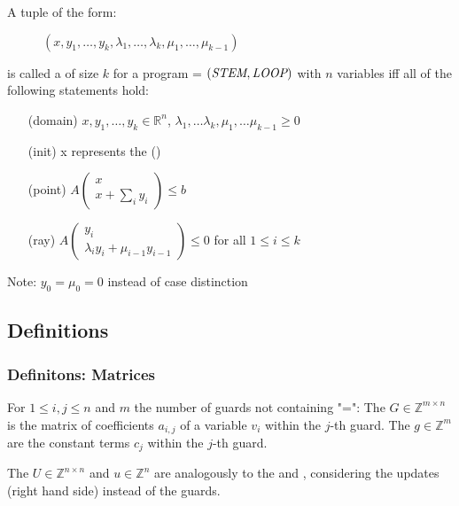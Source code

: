 \begin{frame}
	\begin{definition}
		\label{def:gna}
		A tuple of the form:
		\vspace{-1em}
		\begin{figure}
			\centering
			$(x, y_1, \dots, y_k, \lambda_1, \dots, \lambda_k, \mu_1, \dots, \mu_{k-1})$
		\end{figure}  
		\vspace{-1em}
		is called a \gna of size $k$ for a program = $(\textit{STEM}, \textit{LOOP})$ with $n$ variables iff all of the following statements hold:
		\begin{itemize}
			\setlength{\itemindent}{1in}
			\item[(domain)] $x, y_1, \dots, y_k \in \mathbb{R}^n$, $\lambda_1, \dots \lambda_k, \mu_1, \dots \mu_{k-1} \ge 0$
			\item[(init)] x represents the \startterm (\stem)
			\item[(point)] $A\begin{pmatrix} x \\ x + \sum_i y_i \end{pmatrix} \le b$
			\item[(ray)] $A\begin{pmatrix} y_i \\ \lambda_i y_i + \mu_{i-1} y_{i-1} \end{pmatrix} \le 0$ for all $1 \le i \le k$
		\end{itemize}
		Note: $y_0 = \mu_0 = 0$ instead of case distinction
	\end{definition}
\end{frame}

\subsection{Definitions}

\begin{frame}
	\frametitle{Definitons: Matrices}
	\begin{definition}[\guardmatrix, \guardconstants]
		For $1\le i,j\le n$ and $m$ the number of guards not containing "=":\newline
		The \guardmatrix $G\in \mathbb{Z}^{m\times n}$ is the matrix of coefficients $a_{i,j}$ of a variable $v_i$ within the $j$-th guard. The \guardconstants $g \in \mathbb{Z}^{m}$ are the constant terms $c_j$ within the $j$-th guard.
	\end{definition}
	\begin{definition}[\updatematrix, \updateconstants]
		The \updatematrix $U \in \mathbb{Z}^{n \times n}$ and \updateconstants $u \in \mathbb{Z}^n$ are analogously to the \guardmatrix and \guardconstants , considering the updates (right hand side) instead of the guards.
	\end{definition}
\end{frame}

